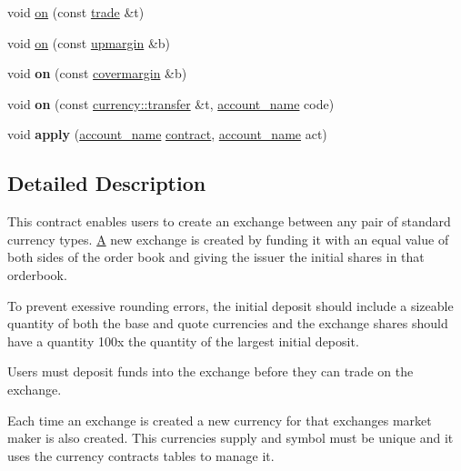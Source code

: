 \begin{DoxyCompactItemize}
\item 
void \mbox{\hyperlink{classaacio_1_1exchange_a43b2bdac8c60fed94c556f2e06bdfda2}{on}} (const \mbox{\hyperlink{structaacio_1_1exchange_1_1trade}{trade}} \&t)
\item 
void \mbox{\hyperlink{classaacio_1_1exchange_a27ed06b661427aca5e67cd9d514e6635}{on}} (const \mbox{\hyperlink{structaacio_1_1exchange_1_1upmargin}{upmargin}} \&b)
\item 
\mbox{\label{classaacio_1_1exchange_a9c73fe32e0b96de00e97b8ec907d4d19}} 
void {\bfseries on} (const \mbox{\hyperlink{structaacio_1_1exchange_1_1covermargin}{covermargin}} \&b)
\item 
\mbox{\label{classaacio_1_1exchange_a3061d20b476589c40eba76b1bfcca836}} 
void {\bfseries on} (const \mbox{\hyperlink{structaacio_1_1currency_1_1transfer}{currency\+::transfer}} \&t, \mbox{\hyperlink{structaacio_1_1chain_1_1name}{account\+\_\+name}} code)
\item 
\mbox{\label{classaacio_1_1exchange_a4c305a7b7166e2b892fe11f67ef70452}} 
void {\bfseries apply} (\mbox{\hyperlink{structaacio_1_1chain_1_1name}{account\+\_\+name}} \mbox{\hyperlink{structaacio_1_1contract}{contract}}, \mbox{\hyperlink{structaacio_1_1chain_1_1name}{account\+\_\+name}} act)
\end{DoxyCompactItemize}


\subsection{Detailed Description}
This contract enables users to create an exchange between any pair of standard currency types. \mbox{\hyperlink{struct_a}{A}} new exchange is created by funding it with an equal value of both sides of the order book and giving the issuer the initial shares in that orderbook.

To prevent exessive rounding errors, the initial deposit should include a sizeable quantity of both the base and quote currencies and the exchange shares should have a quantity 100x the quantity of the largest initial deposit.

Users must deposit funds into the exchange before they can trade on the exchange.

Each time an exchange is created a new currency for that exchanges market maker is also created. This currencies supply and symbol must be unique and it uses the currency contract\textquotesingle{}s tables to manage it. 

